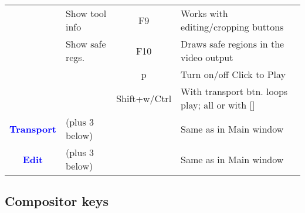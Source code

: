 \begin{center}
\begin{longtable}{ >{\bfseries}c l c p{6cm}}
        & Show tool info & F9 & Works with editing/cropping buttons \\        
        & Show safe regs. & F10 & Draws safe regions in the video output \\        
        &  & p & Turn on/off Click to Play \\         
        &  & Shift+w/Ctrl & With transport btn. loops play; all or with [] \\
        \midrule
        \textcolor{blue}{Transport} & (plus 3 below) &  & Same as in Main window \\
        \midrule
        \textcolor{blue}{Edit} & (plus 3 below) &  & Same as in Main window \\        
        
        \bottomrule  
    \end{longtable}
\end{center}

\subsection{Compositor keys }%
\label{ssec:compositor_keys}

